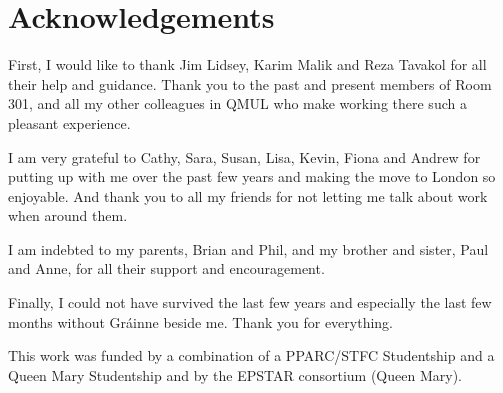 \renewcommand{\CVSrevision}{\version$Id: acknowledgements.tex,v 1.7 2009/11/30 16:29:36 ith Exp $}
% 
% 
\chapter*{Acknowledgements}
\label{ch:acknowledgements}

First, I would like to thank Jim Lidsey, Karim Malik and Reza Tavakol for all their help and
guidance. Thank you to the past and present members of Room 301, and all my other colleagues in
QMUL who make working there such a pleasant experience.

I am very grateful to Cathy, Sara, Susan, Lisa, Kevin, Fiona and Andrew for putting up with me over
the past few years and making the move to London so enjoyable. And thank you to all my friends for
not letting me talk about work when around them.

I am indebted to my parents, Brian and Phil, and my brother and sister, Paul and Anne, for all
their support and encouragement. 

Finally, I could not have survived the last few years and especially the last few months without 
Gr\'{a}inne beside me. Thank you for everything.

\vfill

This work was funded by a combination of a PPARC/STFC Studentship and a Queen Mary Studentship and
by the EPSTAR consortium (Queen Mary).  


